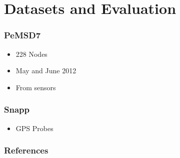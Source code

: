 \documentclass{beamer}
\begin{document}
\section{Datasets and Evaluation}
\begin{frame}
  \frametitle{PeMSD7}
  \begin{itemize}
    \item 228 Nodes
    \item May and June 2012
    \item From sensors
  \end{itemize}
\end{frame}
\begin{frame}
  \frametitle{Snapp}
  \begin{itemize}
    \item GPS Probes
  \end{itemize}
\end{frame}
\begin{frame}[allowframebreaks]
  \frametitle{References}
  \printbibliography
\end{frame}
\end{document}
